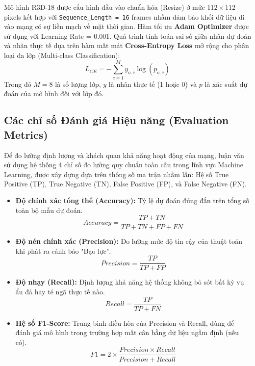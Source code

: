 \documentclass[conference]{IEEEtran}
\begin{document}
Mô hình R3D-18 được cấu hình đầu vào chuẩn hóa (Resize) ở mức $112 \times 112$ pixels kết hợp với \texttt{Sequence\_Length = 16} frames nhầm đảm bảo khối dữ liệu đi vào mạng có sự liền mạch về mặt thời gian. Hàm tối ưu \textbf{Adam Optimizer} được sử dụng với Learning Rate = 0.001. Quá trình tính toán sai số giữa nhãn dự đoán và nhãn thực tế dựa trên hàm mất mát \textbf{Cross-Entropy Loss} mở rộng cho phân loại đa lớp (Multi-class Classification):
\begin{equation}
    L_{CE} = -\sum_{c=1}^M y_{o,c} \log(p_{o,c})
\end{equation}
Trong đó $M=8$ là số lượng lớp, $y$ là nhãn thực tế (1 hoặc 0) và $p$ là xác suất dự đoán của mô hình đối với lớp đó.

\subsection{Các chỉ số Đánh giá Hiệu năng (Evaluation Metrics)}
Để đo lường định lượng và khách quan khả năng hoạt động của mạng, luận văn sử dụng hệ thống 4 chỉ số đo lường quy chuẩn toàn cầu trong lĩnh vực Machine Learning, được xây dựng dựa trên thông số ma trận nhầm lẫn: Hệ số True Positive (TP), True Negative (TN), False Positive (FP), và False Negative (FN).

\begin{itemize}
    \item \textbf{Độ chính xác tổng thể (Accuracy):} Tỷ lệ dự đoán đúng đắn trên tổng số toàn bộ mẫu dự đoán.
    \begin{equation}
        Accuracy = \frac{TP + TN}{TP + TN + FP + FN}
    \end{equation}
    \item \textbf{Độ nén chính xác (Precision):} Đo lường mức độ tin cậy của thuật toán khi phát ra cảnh báo "Bạo lực".
    \begin{equation}
        Precision = \frac{TP}{TP + FP}
    \end{equation}
    \item \textbf{Độ nhạy (Recall):} Định lượng khả năng hệ thống không bỏ sót bất kỳ vụ ẩu đả hay té ngã thực tế nào.
    \begin{equation}
        Recall = \frac{TP}{TP + FN}
    \end{equation}
    \item \textbf{Hệ số F1-Score:} Trung bình điều hòa của Precision và Recall, dùng để đánh giá mô hình trong trường hợp mất cân bằng dữ liệu ngầm định (nếu có).
    \begin{equation}
        F1 = 2 \times \frac{Precision \times Recall}{Precision + Recall}
    \end{equation}
\end{itemize}
\end{document}
